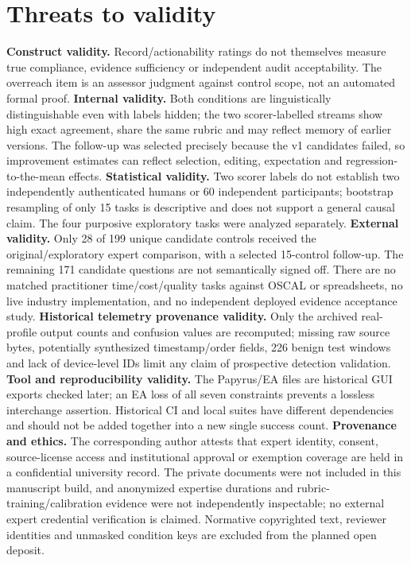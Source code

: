 \documentclass[12pt,a4paper]{article}
\begin{document}
\section{Threats to validity}
\textbf{Construct validity.} Record/actionability ratings do not themselves measure true compliance, evidence sufficiency or independent audit acceptability. The overreach item is an assessor judgment against control scope, not an automated formal proof. \textbf{Internal validity.} Both conditions are linguistically distinguishable even with labels hidden; the two scorer-labelled streams show high exact agreement, share the same rubric and may reflect memory of earlier versions. The follow-up was selected precisely because the v1 candidates failed, so improvement estimates can reflect selection, editing, expectation and regression-to-the-mean effects. \textbf{Statistical validity.} Two scorer labels do not establish two independently authenticated humans or 60 independent participants; bootstrap resampling of only 15 tasks is descriptive and does not support a general causal claim. The four purposive exploratory tasks were analyzed separately. \textbf{External validity.} Only 28 of 199 unique candidate controls received the original/exploratory expert comparison, with a selected 15-control follow-up. The remaining 171 candidate questions are not semantically signed off. There are no matched practitioner time/cost/quality tasks against OSCAL or spreadsheets, no live industry implementation, and no independent deployed evidence acceptance study. \textbf{Historical telemetry provenance validity.} Only the archived real-profile output counts and confusion values are recomputed; missing raw source bytes, potentially synthesized timestamp/order fields, 226 benign test windows and lack of device-level IDs limit any claim of prospective detection validation. \textbf{Tool and reproducibility validity.} The Papyrus/EA files are historical GUI exports checked later; an EA loss of all seven constraints prevents a lossless interchange assertion. Historical CI and local suites have different dependencies and should not be added together into a new single success count. \textbf{Provenance and ethics.} The corresponding author attests that expert identity, consent, source-license access and institutional approval or exemption coverage are held in a confidential university record. The private documents were not included in this manuscript build, and anonymized expertise durations and rubric-training/calibration evidence were not independently inspectable; no external expert credential verification is claimed. Normative copyrighted text, reviewer identities and unmasked condition keys are excluded from the planned open deposit.
\end{document}

